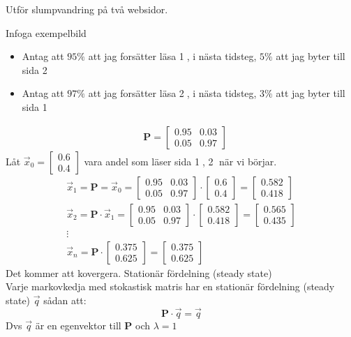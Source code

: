 \begin{Ex}
	Utför slumpvandring på två websidor.
	\begin{center}
		Infoga exempelbild
	\end{center}
	\begin{itemize}
		\item Antag att $95\%$ att jag forsätter läsa \textcircled{1}, i nästa tidsteg, $5\%$ att jag byter till sida \textcircled{2}
		\item Antag att $97\%$ att jag forsätter läsa \textcircled{2}, i nästa tidsteg, $3\%$ att jag byter till sida \textcircled{1}
	\end{itemize}
	\begin{align*}
	&\mathbf{P} = 
	\begin{bmatrix}
		0.95 & 0.03\\
		0.05 & 0.97
	\end{bmatrix}
	\end{align*}
	Låt $\vec{x}_0 = \begin{bmatrix} 0.6\\0.4 \end{bmatrix}$ vara andel som läser sida \textcircled{1}, \textcircled{2} när vi börjar.
	\begin{gather*}
		\vec{x}_1 = \mathbf{P} = \vec{x}_0 = 
		\begin{bmatrix}
			0.95 & 0.03\\
			0.05 & 0.97
		\end{bmatrix} \cdot
		\begin{bmatrix} 0.6\\0.4 \end{bmatrix} = 
		\begin{bmatrix} 0.582\\0.418 \end{bmatrix} \\
		\vec{x}_2 = \mathbf{P} \cdot \vec{x}_1 = 
		\begin{bmatrix}
			0.95 & 0.03\\
			0.05 & 0.97
		\end{bmatrix} \cdot 
		\begin{bmatrix} 0.582\\0.418 \end{bmatrix} = 
		\begin{bmatrix} 0.565\\0.435 \end{bmatrix}\\
		\vdots \\
		\vec{x}_n = \mathbf{P} \cdot
		\begin{bmatrix}
			0.375\\
			0.625
		\end{bmatrix} = 
		\begin{bmatrix}
			0.375\\
			0.625
		\end{bmatrix}
	\end{gather*}
	Det kommer att kovergera. Stationär fördelning (steady state)\\
	Varje markovkedja med stokastisk matris har en stationär fördelning (steady state) $\vec{q}$ sådan att:
	\[
	\mathbf{P} \cdot \vec{q} = \vec{q}
	\]
	Dvs $\vec{q}$ är en egenvektor till \textbf{P} och $\lambda = 1$
\end{Ex}
